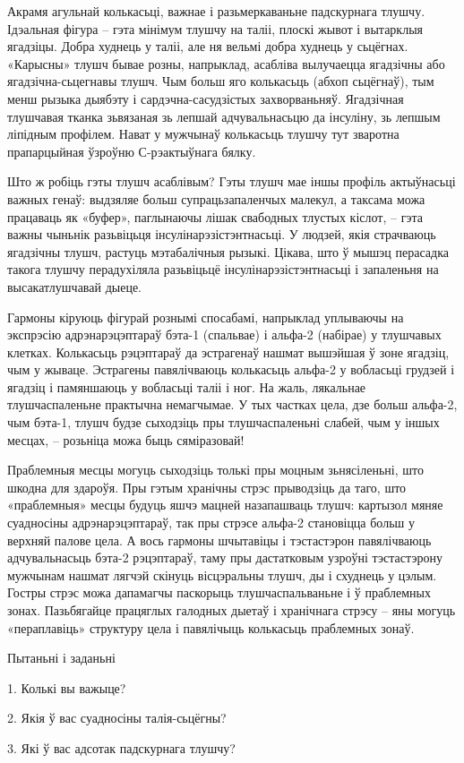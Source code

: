 Акрамя агульнай колькасьці, важнае і разьмеркаваньне падскурнага тлушчу. Ідэальная фігура – гэта мінімум тлушчу на таліі, плоскі жывот і вытарклыя ягадзіцы. Добра худнець у таліі, але ня вельмі добра худнець у сьцёгнах. «Карысны» тлушч бывае розны, напрыклад, асабліва вылучаецца ягадзічны або ягадзічна-сьцегнавы тлушч. Чым больш яго колькасьць (абхоп сьцёгнаў), тым менш рызыка дыябэту і сардэчна-сасудзістых захворваньняў. Ягадзічная тлушчавая тканка зьвязаная зь лепшай адчувальнасьцю да інсуліну, зь лепшым ліпідным профілем. Нават у мужчынаў колькасьць тлушчу тут зваротна прапарцыйная ўзроўню С-рэактыўнага бялку.

Што ж робіць гэты тлушч асаблівым? Гэты тлушч мае іншы профіль актыўнасьці важных генаў: выдзяляе больш супрацьзапаленчых малекул, а таксама можа працаваць як «буфер», паглынаючы лішак свабодных тлустых кіслот, – гэта важны чыньнік разьвіцьця інсулінарэзістэнтнасьці. У людзей, якія страчваюць ягадзічны тлушч, растуць мэтабалічныя рызыкі. Цікава, што ў мышэц перасадка такога тлушчу перадухіляла разьвіцьцё інсулінарэзістэнтнасьці і запаленьня на высакатлушчавай дыеце.

Гармоны кіруюць фігурай рознымі спосабамі, напрыклад уплываючы на экспрэсію адрэнарэцэптараў бэта-1 (спальвае) і альфа-2 (набірае) у тлушчавых клетках. Колькасьць рэцэптараў да эстрагенаў нашмат вышэйшая ў зоне ягадзіц, чым у жываце. Эстрагены павялічваюць колькасьць альфа-2 у вобласьці грудзей і ягадзіц і памяншаюць у вобласьці таліі і ног. На жаль, лякальнае тлушчаспаленьне практычна немагчымае. У тых частках цела, дзе больш альфа-2, чым бэта-1, тлушч будзе сыходзіць пры тлушчаспаленьні слабей, чым у іншых месцах, – розьніца можа быць сяміразовай!

Праблемныя месцы могуць сыходзіць толькі пры моцным зьнясіленьні, што шкодна для здароўя. Пры гэтым хранічны стрэс прыводзіць да таго, што «праблемныя» месцы будуць яшчэ мацней назапашваць тлушч: картызол мяняе суадносіны адрэнарэцэптараў, так пры стрэсе альфа-2 становіцца больш у верхняй палове цела. А вось гармоны шчытавіцы і тэстастэрон павялічваюць адчувальнасьць бэта-2 рэцэптараў, таму пры дастатковым узроўні тэстастэрону мужчынам нашмат лягчэй скінуць вісцэральны тлушч, ды і схуднець у цэлым. Гостры стрэс можа дапамагчы паскорыць тлушчаспальваньне і ў праблемных зонах. Пазьбягайце працяглых галодных дыетаў і хранічнага стрэсу – яны могуць «пераплавіць» структуру цела і павялічыць колькасьць праблемных зонаў.

Пытаньні і заданьні

1. Колькі вы важыце?

2. Якія ў вас суадносіны талія-сьцёгны?

3. Які ў вас адсотак падскурнага тлушчу?

